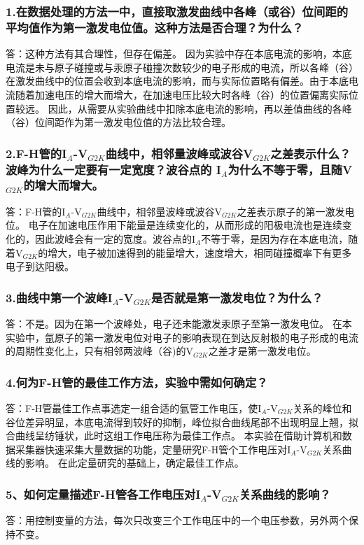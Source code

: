 \documentclass[12pt,a4paper,UTF8]{ctexart}
\begin{document}
	\subsubsection*{1.在数据处理的方法一中，直接取激发曲线中各峰（或谷）位间距的平均值作为第一激发电位值。这种方法是否合理？为什么？ }
	答：这种方法有其合理性，但存在偏差。
	因为实验中存在本底电流的影响，本底电流是未与原子碰撞或与汞原子碰撞次数较少的电子形成的电流，所以各峰（谷）在激发曲线中的位置会收到本底电流的影响，而与实际位置略有偏差。由于本底电流随着加速电压的增大而增大，在加速电压比较大时各峰（谷）的位置偏离实际位置较远。
	因此，从需要从实验曲线中扣除本底电流的影响，再以差值曲线的各峰（谷）位间距作为第一激发电位值的方法比较合理。

	\subsubsection*{2.F-H管的I$_{A}$-V$_{G2K}$曲线中，相邻量波峰或波谷V$_{G2K}$之差表示什么？波峰为什么一定要有一定宽度？波谷点的 I$_A$为什么不等于零，且随V$_{G2K}$的增大而增大。}
	答：F-H管的I$_{A}$-V$_{G2K}$曲线中，相邻量波峰或波谷V$_{G2K}$之差表示原子的第一激发电位。
	电子在加速电压作用下能量是连续变化的，从而形成的阳极电流也是连续变化的，因此波峰会有一定的宽度。波谷点的I$_A$不等于零，是因为存在本底电流，随着V$_{G2K}$的增大，电子被加速得到的能量增大，速度增大，相同碰撞概率下有更多电子到达阳极。

	\subsubsection*{3.曲线中第一个波峰I$_{A}$-V$_{G2K}$是否就是第一激发电位？为什么？}
	答：不是。因为在第一个波峰处，电子还未能激发汞原子至第一激发电位。
	在本实验中，氩原子的第一激发电位对电子的影响表现在到达反射极的电子形成的电流的周期性变化上，只有相邻两波峰（谷)的V$_{G2K}$之差才是第一激发电位。

	\subsubsection*{4.何为F-H管的最佳工作方法，实验中需如何确定？}
	答：F-H管最佳工作点事选定一组合适的氩管工作电压，使I$_{A}$-V$_{G2K}$关系的峰位和谷位差异明显，本底电流得到较好的抑制，峰位拟合曲线尾部不出现明显上翘，拟合曲线呈纺锤状，此时这组工作电压称为最佳工作点。
	本实验在借助计算机和数据采集器快速采集大量数据的功能，定量研究F-H管个工作电压对I$_{A}$-V$_{G2K}$关系曲线的影响。
	在此定量研究的基础上，确定最佳工作点。

	\subsubsection*{5、如何定量描述F-H管各工作电压对I$_{A}$-V$_{G2K}$关系曲线的影响？}
	答：用控制变量的方法，每次只改变三个工作电压中的一个电压参数，另外两个保持不变。
\end{document}
